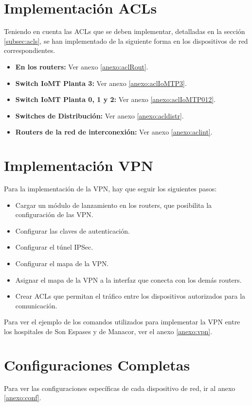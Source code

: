 \section{Implementación ACLs}
Teniendo en cuenta las ACLs que se deben implementar, detalladas en la sección \ref{subsec:acls}, se han implementado de la siguiente forma en los dispositivos de red correspondientes.
\begin{itemize}
    \item \textbf{En los routers:} Ver anexo \ref{anexo:aclRout}.
    \item \textbf{Switch IoMT Planta 3:} Ver anexo \ref{anexo:aclIoMTP3}.
    \item \textbf{Switch IoMT Planta 0, 1 y 2:} Ver anexo \ref{anexo:aclIoMTP012}.
    \item \textbf{Switches de Distribución:} Ver anexo \ref{anexo:acldistr}.
    \item \textbf{Routers de la red de interconexión:} Ver anexo \ref{anexo:aclint}.
\end{itemize}

\section{Implementación VPN}
Para la implementación de la VPN, hay que seguir los siguientes pasos:
\begin{itemize}
    \item Cargar un módulo de lanzamiento en los routers, que posibilita la configuración de las VPN.
    \item Configurar las claves de autenticación.
    \item Configurar el túnel IPSec.
    \item Configurar el mapa de la VPN.
    \item Asignar el mapa de la VPN a la interfaz que conecta con los demás routers.
    \item Crear ACLs que permitan el tráfico entre los dispositivos autorizados para la comunicación.
\end{itemize}

Para ver el ejemplo de los comandos utilizados para implementar la VPN entre los hospitales de Son Espases y de Manacor, ver el anexo \ref{anexo:vpn}.

\section{Configuraciones Completas}
Para ver las configuraciones específicas de cada dispositivo de red, ir al anexo \ref{anexo:conf}.
